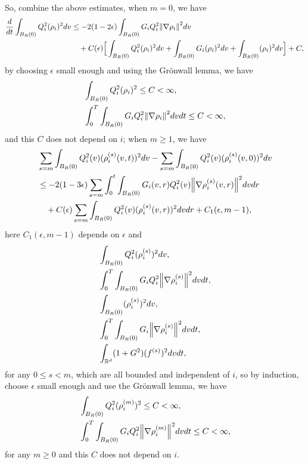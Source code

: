 \documentclass[a4paper, 11pt]{article}
\theoremstyle{plain}
\theoremstyle{remark}
\theoremstyle{definition}
\newcommand{\intd}{\int_{\mathbb{R}^d}}
\newcommand{\intt}{\int_0^T}
\newcommand{\intr}{\int_{B_R(0)}}
\newcommand{\Q}{Q}
\begin{document}
	So, combine the above estimates, when $m=0$, we have
	\begin{equation}
		\begin{aligned}
		    \frac{d}{dt}\intr \Q_i^2(\rho_i)^2dv&\leq -2(1-2\epsilon)\intr G_i\Q_i^2\norm{\nabla\rho_i}^2dv\\
            &\quad+C(\epsilon)\Big[\intr \Q_i^2(\rho_i)^2dv+\intr G_i(\rho_i)^2dv+\intr(\rho_i)^2dv\Big]+C,
		\end{aligned}
	\end{equation}
	by choosing $\epsilon$ small enough and using the Gr\"onwall lemma, we have
\begin{eqnarray}
	&	\intr \Q_i^2(\rho_i)^2\leq C<\infty,\\
	&\intt\intr G_i\Q_i^2\norm{\nabla\rho_i}^2dvdt\leq C<\infty,
\end{eqnarray}
	and this $C$ does not depend on $i$; when $m\geq 1$, we have
	\begin{equation}\label{eq:g117}
		\begin{aligned}
			&\sum_{s=m}\intr\Q_i^2(v)(\rho_i^{(s)}(v,t))^2dv-\sum_{s=m}\intr\Q_i^2(v)(\rho_i^{(s)}(v,0))^2dv\\
            &\leq -2(1-3\epsilon)\sum_{s=m}\int_0^t\intr G_i(v,r)Q_i^2(v)\norm{\nabla\rho_i^{(s)}(v,r)}^2dvdr\\
			&\quad+C(\epsilon)\sum_{s=m}\intr\Q_i^2(v)(\rho_i^{(s)}(v,r))^2dvdr+C_1(\epsilon,m-1),
		\end{aligned}
	\end{equation}
    here $C_1(\epsilon,m-1)$ depends on $\epsilon$ and 
    \begin{eqnarray*}
        &\intr Q_i^2(\rho^{(s)}_i)^2dv,\\
        &\intt\intr G_i\Q_i^2\norm{\nabla\rho^{(s)}_i}^2dvdt,\\
        &\intr (\rho_i^{(s)})^2dv,\\
        &\intt\intr G_i\norm{\nabla\rho^{(s)}_i}^2dvdt,\\
        &\intd (1+G^2)(f^{(s)})^2dvdt,
    \end{eqnarray*}
    for any $0\leq s<m$, which are all bounded and independent of $i$,
	so by induction, choose $\epsilon$ small enough and use the Gr\"onwall lemma, we have 
	\begin{eqnarray}
		&	\intr \Q_i^2(\rho^{(m)}_i)^2\leq C<\infty,\label{eq:g118}\\
		&\intt\intr G_i\Q_i^2\norm{\nabla\rho^{(m)}_i}^2dvdt\leq C<\infty\label{eq:g119},
	\end{eqnarray}
	for any $m\geq 0$ and this $C$ does not depend on $i$.
	
\end{document}
